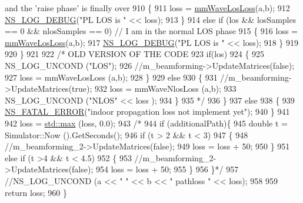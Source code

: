 \begin{DoxyCode}
{       and the 'raise phase' is finally over}
910                         \{
911                                 loss = \hyperlink{classns3_1_1BuildingsObstaclePropagationLossModel_ad689fe28aa4e050953598741fa1a627c}{mmWaveLosLoss}(a,b);
912                                 \hyperlink{group__logging_ga413f1886406d49f59a6a0a89b77b4d0a}{NS\_LOG\_DEBUG}(\textcolor{stringliteral}{"PL LOS  is "} << loss);        
913                         \}
914                         \textcolor{keywordflow}{else} \textcolor{keywordflow}{if} (los && losSamples == 0 && nlosSamples == 0) \textcolor{comment}{// I am in the normal LOS
       phase}
915                         \{
916                                 loss = \hyperlink{classns3_1_1BuildingsObstaclePropagationLossModel_ad689fe28aa4e050953598741fa1a627c}{mmWaveLosLoss}(a,b);
917                                 \hyperlink{group__logging_ga413f1886406d49f59a6a0a89b77b4d0a}{NS\_LOG\_DEBUG}(\textcolor{stringliteral}{"PL LOS  is "} << loss);        
918                         \}
919 
920                 \}
921 
922                 \textcolor{comment}{/* OLD VERSION OF THE CODE}
923 \textcolor{comment}{                if(los)}
924 \textcolor{comment}{                \{}
925 \textcolor{comment}{                        NS\_LOG\_UNCOND ("LOS");}
926 \textcolor{comment}{                        //m\_beamforming->UpdateMatrices(false);}
927 \textcolor{comment}{                        loss = mmWaveLosLoss (a,b);}
928 \textcolor{comment}{                \}}
929 \textcolor{comment}{                else}
930 \textcolor{comment}{                \{}
931 \textcolor{comment}{                        //m\_beamforming->UpdateMatrices(true);}
932 \textcolor{comment}{                        loss = mmWaveNlosLoss (a,b);}
933 \textcolor{comment}{                        NS\_LOG\_UNCOND ("NLOS" << loss );}
934 \textcolor{comment}{                \}}
935 \textcolor{comment}{                */}
936         \}
937         \textcolor{keywordflow}{else}
938         \{
939                 \hyperlink{group__fatal_ga5131d5e3f75d7d4cbfd706ac456fdc85}{NS\_FATAL\_ERROR}(\textcolor{stringliteral}{"indoor propagation loss not implement yet"});
940         \}
941 
942         loss = \hyperlink{80211b_8c_affe776513b24d84b39af8ab0930fef7f}{std::max} (loss, 0.0);
943 \textcolor{comment}{/*}
944 \textcolor{comment}{if (additionalPath)\{}
945 \textcolor{comment}{        double t = Simulator::Now ().GetSeconds();}
946 \textcolor{comment}{        if (t > 2 && t < 3)}
947 \textcolor{comment}{        \{}
948 \textcolor{comment}{                //m\_beamforming\_2->UpdateMatrices(false);}
949 \textcolor{comment}{                loss = loss + 50;}
950 \textcolor{comment}{        \}}
951 \textcolor{comment}{        else if (t >4  && t < 4.5)}
952 \textcolor{comment}{        \{}
953 \textcolor{comment}{                //m\_beamforming\_2->UpdateMatrices(false);}
954 \textcolor{comment}{                loss = loss + 50;}
955 \textcolor{comment}{        \}}
956 \textcolor{comment}{\}*/}
957         \textcolor{comment}{//NS\_LOG\_UNCOND (a << " " << b << " pathloss " << loss);}
958 
959         \textcolor{keywordflow}{return} loss;
960 \}
\end{DoxyCode}


